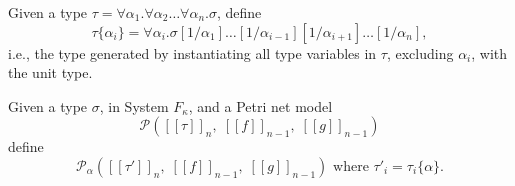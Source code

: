 \documentclass[../../Dissertation.tex]{subfiles}
\begin{document}
\begin{definition}\label{def:instantunit}
  Given a type $\tau = \forall \alpha_1.\forall \alpha_2\ldots\forall \alpha_n.\sigma$, define
  \begin{equation*}
    \tau\{\alpha_i\} = \forall \alpha_i.\sigma[1/\alpha_1]\ldots[1/\alpha_{i-1}][1/\alpha_{i+1}]\ldots[1/\alpha_n],
  \end{equation*}
  i.e., the type generated by instantiating all type variables in $\tau$, excluding $\alpha_i$, with the unit type.
\end{definition}

\begin{definition}
  Given a type $\sigma$, in System $F_\kappa$, and a Petri net model 
  \begin{equation*}
  \mathcal{P}([\![\tau]\!]_n,\; [\![f]\!]_{n-1},\; [\![g]\!]_{n-1})
  \end{equation*}
  define
  \begin{equation*}
    \mathcal{P}_\alpha([\![\tau']\!]_n,\; [\![f]\!]_{n-1},\; [\![g]\!]_{n-1}) \text{ where } \tau'_i = \tau_i\{\alpha\}.
  \end{equation*}
\end{definition}
\end{document}
